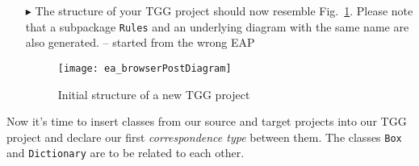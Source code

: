 \begin{itemize}
\item[$\blacktriangleright$] The structure of your TGG project should now resemble Fig.~\ref{fig:new_tgg_project}. Please note that a subpackage \texttt{Rules}
and an underlying diagram with the same name are also generated. \update -- started from the wrong EAP

\begin{figure}[htbp]
\begin{center}
  \texttt{[image: ea\_browserPostDiagram]}
  \caption{Initial structure of a new TGG project}  
  \label{fig:new_tgg_project}
\end{center}
\end{figure}
\end{itemize}
\clearpage

Now it's time to insert classes from our source and target projects into our TGG project and declare our first \emph{correspondence type} between them.
The classes \texttt{Box} and \texttt{Dictionary} are to be related to each other.

